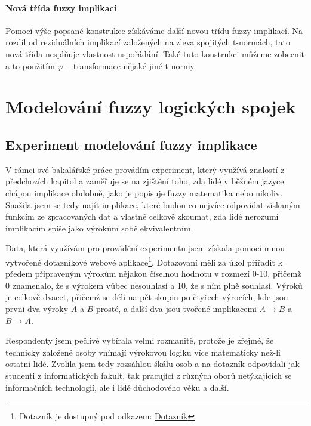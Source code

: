 \subsubsection{Nová třída fuzzy implikací}
Pomocí výše popsané konstrukce získáváme další novou třídu fuzzy implikací. Na rozdíl od reziduálních implikací založených na zleva spojitých t-normách, tato nová třída nespl\v nuje vlastnost uspořádání. Také tuto konstrukci můžeme zobecnit a to použitím $\varphi-$transformace nějaké jiné t-normy.


\chapter{Modelování fuzzy logických spojek}
\label{kap4}

\section{Experiment modelování fuzzy implikace}
V rámci své bakalářské práce provádím experiment, který využívá znalostí z předchozích kapitol a zaměřuje se na zjištění toho, zda lidé v běžném jazyce chápou implikace obdobně, jako je popisuje fuzzy matematika nebo nikoliv. Snažila jsem se tedy najít implikace, které budou co nejvíce odpovídat získaným funkcím ze zpracovaných dat a vlastně celkově zkoumat, zda lidé nerozumí implikacím spíše jako výrok\r um sobě ekvivalentním.

Data, která využívám pro provádění experimentu jsem získala pomocí mnou vytvořené dotazníkové webové aplikace\footnote{Dotazník je dostupný pod odkazem: \href{https://www.stud.fit.vutbr.cz/~xjirmu00/bp/}{Dotazník}}. Dotazovaní měli za \' ukol přiřadit k předem připraveným výrok\r um nějakou číselnou hodnotu v rozmezí 0-10, přičemž 0 znamenalo, že s výrokem v\r ubec nesouhlasí a 10, že s ním plně souhlasí. Výrok\r u je celkově dvacet, přičemž se dělí na pět skupin po čtyřech výrocích, kde jsou první dva výroky $A$ a $B$ prosté, a další dva jsou tvořené implikacemi $A \to B$ a $B \to A$.

Respondenty jsem pečlivě vybírala velmi rozmanitě, protože je zřejmé, že technicky založené osoby vnímají výrokovou logiku více matematicky než-li ostatní lidé. Zvolila jsem tedy rozsáhlou škálu osob a na dotazník odpovídali jak studenti z informatických fakult, tak pracující z r\r uzných obor\r u netýkajících se informačních technologií, ale i lidé d\r uchodového věku a další.

